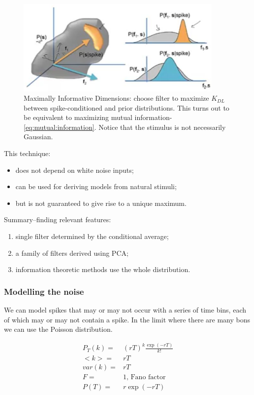 \documentclass[]{article}
\begin{document}
\begin{figure}[H]
	\caption[Maximally Informative Dimensions]{Maximally Informative Dimensions: choose filter to maximize $K_{DL}$ between spike-conditioned and prior distributions. This turns out to be equivalent to maximizing mutual information-\eqref{eq:mutual:information}. Notice that the stimulus is not necessarily Gaussian.}
	\includegraphics[width=0.9\textwidth]{maximally-informative-dimensions}
\end{figure}
This technique:
\begin{itemize}
	\item does not depend on white noise inputs;
	\item can be used for deriving models from natural stimuli;
	\item but is not guaranteed to give rise to a unique maximum.
\end{itemize}

Summary--finding relevant features:
\begin{enumerate}
	\item single filter determined by the conditional average;
	\item  a family of filters derived using PCA;
	\item information theoretic methods use the whole distribution.
\end{enumerate}

\subsubsection{Modelling the noise}

We can model spikes that may or may not occur with a series of time bins, each of which may or may not contain a spike. In the limit where there are many bons we can use the Poisson distribution.

\begin{align*}
	P_T(k) =& (rT)^k\frac{\exp(-rT)}{k!}\\
	<k> =& rT\\
	var(k) =& rT\\
	F =& 1 \text{, Fano factor}\\
	P(T)=&r \exp(-rT)
\end{align*}
\end{document}
